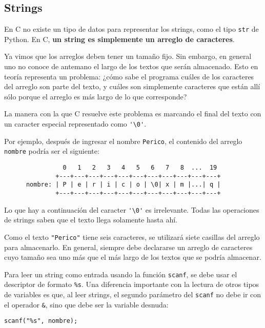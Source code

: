 \subsection{Strings}

En C no existe un tipo de datos para representar los strings, como el
tipo \lstinline!str! de Python. En C, \textbf{un string es simplemente
un arreglo de caracteres}.

Ya vimos que los arreglos deben tener un tamaño fijo. Sin embargo, en
general uno no conoce de antemano el largo de los textos que serán
almacenado. Esto en teoría representa un problema: ¿cómo sabe el
programa cuáles de los caracteres del arreglo son parte del texto, y
cuáles son simplemente caracteres que están allí sólo porque el arreglo
es más largo de lo que corresponde?

La manera con la que C resuelve este problema es marcando el final del
texto con un caracter especial representado como \lstinline!'\0'!.

Por ejemplo, después de ingresar el nombre \lstinline!Perico!, el
contenido del arreglo \lstinline!nombre! podría ser el siguiente:

\begin{verbatim}
                0   1   2   3   4   5   6   7   8  ...  19
              +---+---+---+---+---+---+---+---+---+---+---+
      nombre: | P | e | r | i | c | o | \0| x | m |...| q |
              +---+---+---+---+---+---+---+---+---+---+---+
\end{verbatim}

Lo que hay a continuación del caracter \lstinline!'\0'! es irrelevante.
Todas las operaciones de strings saben que el texto llega solamente
hasta ahí.

Como el texto \lstinline!"Perico"! tiene seis caracteres, se utilizará
siete casillas del arreglo para almacenarlo. En general, siempre debe
declararse un arreglo de caracteres cuyo tamaño sea uno más que el más
largo de los textos que se podría almacenar.

Para leer un string como entrada usando la función \lstinline!scanf!, se
debe usar el descriptor de formato \lstinline!%s!. Una diferencia
importante con la lectura de otros tipos de variables es que, al leer
strings, el segundo parámetro del \lstinline!scanf! no debe ir con el
operador \lstinline!&!, sino que debe ser la variable desnuda:

\begin{lstlisting}
scanf("%s", nombre);
\end{lstlisting}

